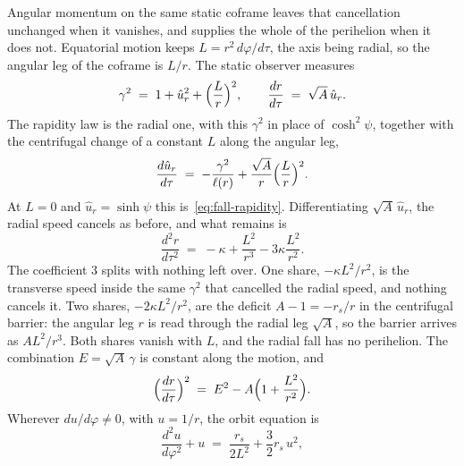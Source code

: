 \documentclass[a4paper]{article}
\begin{document}
Angular momentum on the same static coframe leaves that cancellation unchanged when it vanishes, and supplies the whole of the perihelion when it does not. Equatorial motion keeps \(L=r^{2}\,d\varphi/d\tau\), the axis being radial, so the angular leg of the coframe is \(L/r\). The static observer measures
\begin{equation}
\gamma^{2} \;=\; 1+\hat{u}_{r}^{2}+\Bigl(\frac{L}{r}\Bigr)^{2},
\qquad
\frac{dr}{d\tau} \;=\; \sqrt{A}\,\hat{u}_{r}.
\label{eq:angular-frame}
\end{equation}
The rapidity law is the radial one, with this \(\gamma^{2}\) in place of \(\cosh^{2}\psi\), together with the centrifugal change of a constant \(L\) along the angular leg,
\begin{equation}
\frac{d\hat{u}_{r}}{d\tau} \;=\; -\frac{\gamma^{2}}{\ell(r)}+\frac{\sqrt{A}}{r}\Bigl(\frac{L}{r}\Bigr)^{2}.
\label{eq:angular-rapidity}
\end{equation}
At \(L=0\) and \(\hat{u}_{r}=\sinh\psi\) this is~\eqref{eq:fall-rapidity}. Differentiating \(\sqrt{A}\,\hat{u}_{r}\), the radial speed cancels as before, and what remains is
\begin{equation}
\frac{d^{2}r}{d\tau^{2}} \;=\; -\kappa+\frac{L^{2}}{r^{3}}-3\kappa\frac{L^{2}}{r^{2}}.
\label{eq:areal-angular}
\end{equation}
The coefficient \(3\) splits with nothing left over. One share, \(-\kappa L^{2}/r^{2}\), is the transverse speed inside the same \(\gamma^{2}\) that cancelled the radial speed, and nothing cancels it. Two shares, \(-2\kappa L^{2}/r^{2}\), are the deficit \(A-1=-r_{s}/r\) in the centrifugal barrier: the angular leg \(r\) is read through the radial leg \(\sqrt{A}\), so the barrier arrives as \(A L^{2}/r^{3}\). Both shares vanish with \(L\), and the radial fall has no perihelion. The combination \(E=\sqrt{A}\,\gamma\) is constant along the motion, and
\begin{equation}
\Bigl(\frac{dr}{d\tau}\Bigr)^{2} \;=\; E^{2}-A\Bigl(1+\frac{L^{2}}{r^{2}}\Bigr).
\label{eq:orbit-energy}
\end{equation}
Wherever \(du/d\varphi\neq 0\), with \(u=1/r\), the orbit equation is
\begin{equation}
\frac{d^{2}u}{d\varphi^{2}}+u \;=\; \frac{r_{s}}{2L^{2}}+\frac{3}{2}r_{s}\,u^{2},
\label{eq:binet}
\end{equation}
\end{document}
